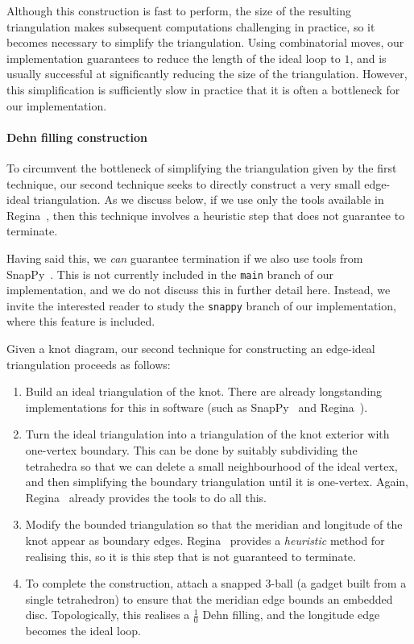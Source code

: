 \documentclass[10pt,a4paper]{amsart}
\begin{document}
Although this construction is fast to perform, the size of the resulting triangulation makes
subsequent computations challenging in practice, so it becomes necessary to simplify the triangulation.
Using combinatorial moves, our implementation guarantees to reduce the length of the ideal loop to $1$, and is usually successful at significantly reducing the size of the triangulation.
However, this simplification is sufficiently slow in practice that it is often a bottleneck for our implementation.

\paragraph*{Dehn filling construction}

To circumvent the bottleneck of simplifying the triangulation given by the first technique,
our second technique seeks to directly construct a very small edge-ideal triangulation.
As we discuss below, if we use only the tools available in Regina~\cite{Regina}, then this
technique involves a heuristic step that does not guarantee to terminate.

Having said this, we \emph{can} guarantee termination if we also use tools from
SnapPy~\cite{SnapPy}. This is not currently included in the \texttt{main} branch of our
implementation, and we do not discuss this in further detail here. Instead, we invite the
interested reader to study the \texttt{snappy} branch of our implementation, where this
feature is included.

Given a knot diagram, our second technique for constructing an edge-ideal triangulation proceeds as follows:
\begin{enumerate}
\item
Build an ideal triangulation of the knot.
There are already longstanding implementations for this in software (such as SnapPy~\cite{SnapPy} and Regina~\cite{Regina}).
\item
Turn the ideal triangulation into a triangulation of the knot exterior with one-vertex boundary.
This can be done by suitably subdividing the tetrahedra so that we can delete a small neighbourhood of the ideal vertex,
and then simplifying the boundary triangulation until it is one-vertex.
Again, Regina~\cite{Regina} already provides the tools to do all this.
\item
Modify the bounded triangulation so that the meridian and longitude of the knot appear as boundary edges.
Regina~\cite{Regina} provides a \emph{heuristic} method for realising this, so it is this step that is not guaranteed to terminate.
\item
To complete the construction, attach a snapped $3$-ball (a gadget built from a single tetrahedron) to ensure that the meridian edge bounds an embedded disc.
Topologically, this realises a $\frac{1}{0}$ Dehn filling, and the longitude edge becomes the ideal loop.
\end{enumerate}
\end{document}
